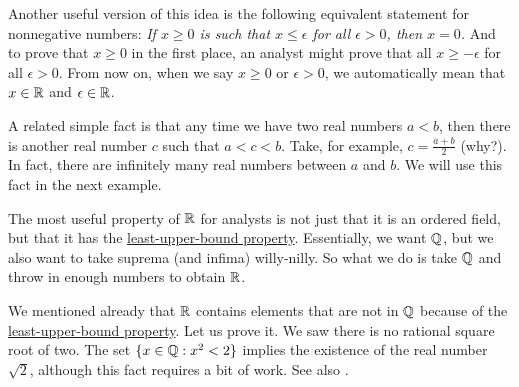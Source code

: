 Another useful version of this idea is the following equivalent
statement for nonnegative numbers: \emph{If $x \geq 0$ is such that $x \leq \epsilon$ for all
$\epsilon > 0$, then $x = 0$.}
And to prove that $x \geq 0$ in the first place, an analyst might prove
that all $x \geq -\epsilon$ for all $\epsilon > 0$.
From now on, when we say $x \geq 0$ or
$\epsilon > 0$, we automatically mean that $x \in {\mathbb{R}}$ and $\epsilon \in {\mathbb{R}}$.

A related simple fact is that 
any time we have two real numbers $a < b$, then there is another
real number $c$ such that
$a < c < b$.  Take, for example, $c = \frac{a+b}{2}$ (why?).  In fact,
there are infinitely many real numbers between $a$ and $b$.
We will use this fact in the next example.

The most useful property of ${\mathbb{R}}$ for analysts
is not just that it is an ordered field, but that it has the
\hyperref[defn:lub]{least-upper-bound property}.  Essentially, we want ${\mathbb{Q}}$, but we also
want to take suprema (and infima) willy-nilly.  So what we do is 
take ${\mathbb{Q}}$ and
throw in enough numbers to obtain ${\mathbb{R}}$.

We mentioned already that ${\mathbb{R}}$ contains elements that are not in ${\mathbb{Q}}$
because of the \hyperref[defn:lub]{least-upper-bound property}.  Let us
prove it.
We saw there is no
rational square root of two.  The set
$\{ x \in {\mathbb{Q}} : x^2 < 2 \}$ implies the existence of the real number
$\sqrt{2}$, although this fact requires a bit of work.  See also
.

